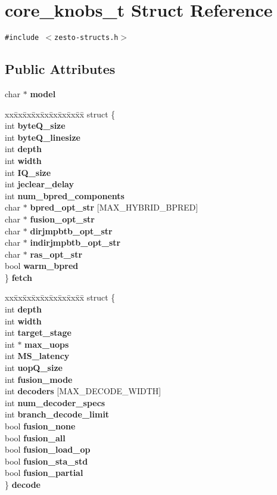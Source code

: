 \section{core\_\-knobs\_\-t Struct Reference}
\label{structcore__knobs__t}
{\tt \#include $<$zesto-structs.h$>$}

\subsection*{Public Attributes}
\begin{CompactItemize}
\item 
char $\ast$ {\bf model}
\item 
\begin{tabbing}
xx\=xx\=xx\=xx\=xx\=xx\=xx\=xx\=xx\=\kill
struct \{\\
\>int {\bf byteQ\_size}\\
\>int {\bf byteQ\_linesize}\\
\>int {\bf depth}\\
\>int {\bf width}\\
\>int {\bf IQ\_size}\\
\>int {\bf jeclear\_delay}\\
\>int {\bf num\_bpred\_components}\\
\>char $\ast$ {\bf bpred\_opt\_str} [MAX\_HYBRID\_BPRED]\\
\>char $\ast$ {\bf fusion\_opt\_str}\\
\>char $\ast$ {\bf dirjmpbtb\_opt\_str}\\
\>char $\ast$ {\bf indirjmpbtb\_opt\_str}\\
\>char $\ast$ {\bf ras\_opt\_str}\\
\>bool {\bf warm\_bpred}\\
\} {\bf fetch}\\

\end{tabbing}\item 
\begin{tabbing}
xx\=xx\=xx\=xx\=xx\=xx\=xx\=xx\=xx\=\kill
struct \{\\
\>int {\bf depth}\\
\>int {\bf width}\\
\>int {\bf target\_stage}\\
\>int $\ast$ {\bf max\_uops}\\
\>int {\bf MS\_latency}\\
\>int {\bf uopQ\_size}\\
\>int {\bf fusion\_mode}\\
\>int {\bf decoders} [MAX\_DECODE\_WIDTH]\\
\>int {\bf num\_decoder\_specs}\\
\>int {\bf branch\_decode\_limit}\\
\>bool {\bf fusion\_none}\\
\>bool {\bf fusion\_all}\\
\>bool {\bf fusion\_load\_op}\\
\>bool {\bf fusion\_sta\_std}\\
\>bool {\bf fusion\_partial}\\
\} {\bf decode}\\


\end{tabbing}
\end{CompactItemize}
